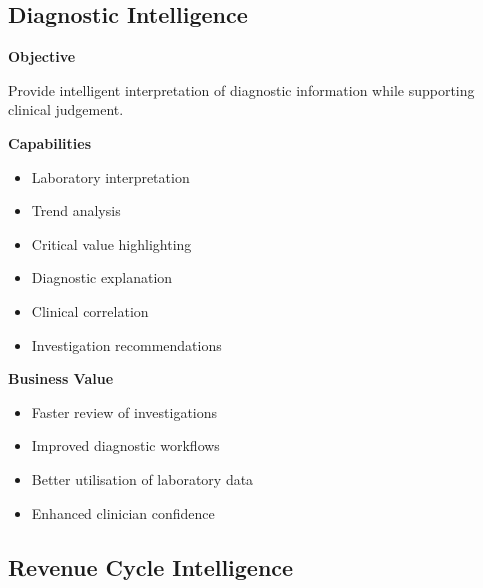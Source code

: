 \subsection{Diagnostic Intelligence}

\begin{capability}

\textbf{Objective}

Provide intelligent interpretation of diagnostic information while supporting clinical judgement.

\vspace{3mm}

\textbf{Capabilities}

\begin{itemize}

\item Laboratory interpretation

\item Trend analysis

\item Critical value highlighting

\item Diagnostic explanation

\item Clinical correlation

\item Investigation recommendations

\end{itemize}

\vspace{3mm}

\textbf{Business Value}

\begin{itemize}

\item Faster review of investigations

\item Improved diagnostic workflows

\item Better utilisation of laboratory data

\item Enhanced clinician confidence

\end{itemize}

\end{capability}


\subsection{Revenue Cycle Intelligence}

